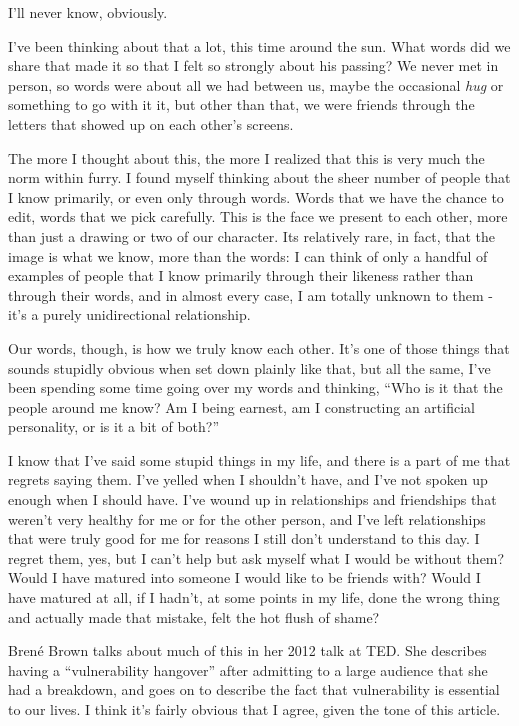 I'll never know, obviously.

I've been thinking about that a lot, this time around the sun. What words did we share that made it so that I felt so strongly about his passing? We never met in person, so words were about all we had between us, maybe the occasional \emph{hug} or something to go with it it, but other than that, we were friends through the letters that showed up on each other's screens.

The more I thought about this, the more I realized that this is very much the norm within furry. I found myself thinking about the sheer number of people that I know primarily, or even only through words. Words that we have the chance to edit, words that we pick carefully. This is the face we present to each other, more than just a drawing or two of our character. Its relatively rare, in fact, that the image is what we know, more than the words: I can think of only a handful of examples of people that I know primarily through their likeness rather than through their words, and in almost every case, I am totally unknown to them - it's a purely unidirectional relationship.

Our words, though, is how we truly know each other. It's one of those things that sounds stupidly obvious when set down plainly like that, but all the same, I've been spending some time going over my words and thinking, ``Who is it that the people around me know? Am I being earnest, am I constructing an artificial personality, or is it a bit of both?''

I know that I've said some stupid things in my life, and there is a part of me that regrets saying them. I've yelled when I shouldn't have, and I've not spoken up enough when I should have. I've wound up in relationships and friendships that weren't very healthy for me or for the other person, and I've left relationships that were truly good for me for reasons I still don't understand to this day. I regret them, yes, but I can't help but ask myself what I would be without them? Would I have matured into someone I would like to be friends with? Would I have matured at all, if I hadn't, at some points in my life, done the wrong thing and actually made that mistake, felt the hot flush of shame?

Brené Brown talks about much of this in her 2012 talk at TED. She describes having a ``vulnerability hangover'' after admitting to a large audience that she had a breakdown, and goes on to describe the fact that vulnerability is essential to our lives. I think it's fairly obvious that I agree, given the tone of this article.

